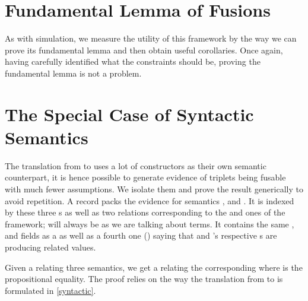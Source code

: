 
\section{Fundamental Lemma of Fusions}

As with simulation, we measure the utility of this framework by the way we can
prove its fundamental lemma and then obtain useful corollaries. Once again,
having carefully identified what the constraints should be, proving the fundamental
lemma is not a problem.


\section{The Special Case of Syntactic Semantics}

The translation from  to  uses a lot of constructors
as their own semantic counterpart, it is hence possible to generate evidence of
 triplets being fusable with much fewer assumptions. We isolate
them and prove the result generically to avoid repetition. A 
record packs the evidence for  semantics ,  and
. It is indexed by these three s as well as two relations
corresponding to the  and  ones of the  framework;
 will always be  as we are talking about terms. It contains the
same ,  and  fields as a 
as well as a fourth one () saying that  and 's
respective s are producing related values.



Given a  relating three  semantics, we get a
 relating the corresponding  where  is the
propositional equality. The proof relies on the way the translation from
 to  is formulated in \cref{syntactic}.

